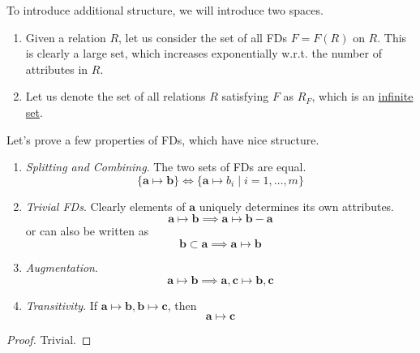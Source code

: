     To introduce additional structure, we will introduce two spaces. 
    \begin{enumerate}
      \item Given a relation $R$, let us consider the set of all FDs $F = F(R)$ on $R$. This is clearly a large set, which increases exponentially w.r.t. the number of attributes in $R$. 
      \item Let us denote the set of all relations $R$ satisfying $F$ as $R_F$, which is an \hyperref[st-def:infinite-set]{infinite set}. 
    \end{enumerate}

    \begin{theorem}
      \label{thm:armstrong-axioms}
      Let's prove a few properties of FDs, which have nice structure. 
      \begin{enumerate}
        \item \textit{Splitting and Combining}. The two sets of FDs are equal. 
          \begin{equation}
            \{\mathbf{a} \mapsto \mathbf{b}\} \iff \{ \mathbf{a} \mapsto b_i \mid i = 1, \ldots, m\}
          \end{equation}

        \item \textit{Trivial FDs}. Clearly elements of $\mathbf{a}$ uniquely determines its own attributes. 
          \begin{equation}
            \mathbf{a} \mapsto \mathbf{b} \implies \mathbf{a} \mapsto \mathbf{b} - \mathbf{a}
          \end{equation}
          or can also be written as 
          \begin{equation}
            \mathbf{b} \subset \mathbf{a} \implies \mathbf{a} \mapsto \mathbf{b}
          \end{equation}

        \item \textit{Augmentation}. 
          \begin{equation}
            \mathbf{a} \mapsto \mathbf{b} \implies \mathbf{a}, \mathbf{c} \mapsto \mathbf{b}, \mathbf{c}
          \end{equation}

        \item \textit{Transitivity}. If $\mathbf{a} \mapsto \mathbf{b}, \mathbf{b} \mapsto \mathbf{c}$, then 
          \begin{equation}
            \mathbf{a} \mapsto \mathbf{c}
          \end{equation}
      \end{enumerate}
    \end{theorem}
    \begin{proof}
      Trivial. 
    \end{proof}


